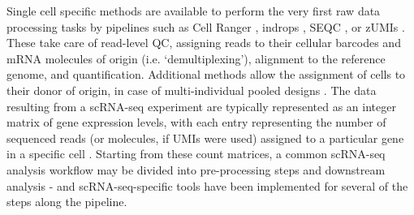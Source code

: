 \clearpage

Single cell specific methods are available to perform the very first raw data processing tasks by pipelines such as Cell Ranger \cite{zheng2017massively}, indrops \cite{klein2015droplet}, SEQC  \cite{azizi2018single}, or zUMIs \cite{parekh2018zumis}.
These take care of read-level QC, assigning reads to their cellular barcodes and mRNA molecules of origin (i.e. `demultiplexing'), alignment to the reference genome, and quantification. 
Additional methods allow the assignment of cells to their donor of origin, in case of  multi-individual pooled designs \cite{kang2018multiplexed, mccarthy2020cardelino}.
The data resulting from a scRNA-seq experiment are typically represented as an integer matrix of gene expression levels, with each entry representing the number of sequenced reads (or molecules, if UMIs were used) assigned to a particular gene in a specific
cell \cite{griffiths2018using}.
Starting from these count matrices, a common scRNA-seq analysis workflow may be divided into pre-processing steps and downstream analysis \cite{luecken2019current} - and scRNA-seq-specific tools have been implemented for several of the steps along the pipeline.\\

